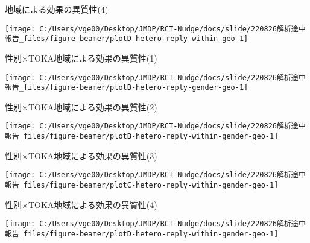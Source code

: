 \documentclass[
      aspectratio=169,
        12pt,
    ]{beamer}
\begin{document}
\begin{frame}{地域による効果の異質性(4)}
\protect\hypertarget{ux5730ux57dfux306bux3088ux308bux52b9ux679cux306eux7570ux8ceaux60274}{}
\begin{center}\texttt{[image: C:/Users/vge00/Desktop/JMDP/RCT-Nudge/docs/slide/220826解析途中報告\_files/figure-beamer/plotD-hetero-reply-within-geo-1]} \end{center}
\end{frame}

\begin{frame}{性別×TOKA地域による効果の異質性(1)}
\protect\hypertarget{ux6027ux5225tokaux5730ux57dfux306bux3088ux308bux52b9ux679cux306eux7570ux8ceaux60271}{}
\begin{center}\texttt{[image: C:/Users/vge00/Desktop/JMDP/RCT-Nudge/docs/slide/220826解析途中報告\_files/figure-beamer/plotB-hetero-reply-gender-geo-1]} \end{center}
\end{frame}

\begin{frame}{性別×TOKA地域による効果の異質性(2)}
\protect\hypertarget{ux6027ux5225tokaux5730ux57dfux306bux3088ux308bux52b9ux679cux306eux7570ux8ceaux60272}{}
\begin{center}\texttt{[image: C:/Users/vge00/Desktop/JMDP/RCT-Nudge/docs/slide/220826解析途中報告\_files/figure-beamer/plotB-hetero-reply-within-gender-geo-1]} \end{center}
\end{frame}

\begin{frame}{性別×TOKA地域による効果の異質性(3)}
\protect\hypertarget{ux6027ux5225tokaux5730ux57dfux306bux3088ux308bux52b9ux679cux306eux7570ux8ceaux60273}{}
\begin{center}\texttt{[image: C:/Users/vge00/Desktop/JMDP/RCT-Nudge/docs/slide/220826解析途中報告\_files/figure-beamer/plotC-hetero-reply-within-gender-geo-1]} \end{center}
\end{frame}

\begin{frame}{性別×TOKA地域による効果の異質性(4)}
\protect\hypertarget{ux6027ux5225tokaux5730ux57dfux306bux3088ux308bux52b9ux679cux306eux7570ux8ceaux60274}{}
\begin{center}\texttt{[image: C:/Users/vge00/Desktop/JMDP/RCT-Nudge/docs/slide/220826解析途中報告\_files/figure-beamer/plotD-hetero-reply-within-gender-geo-1]} \end{center}
\end{frame}
\end{document}
